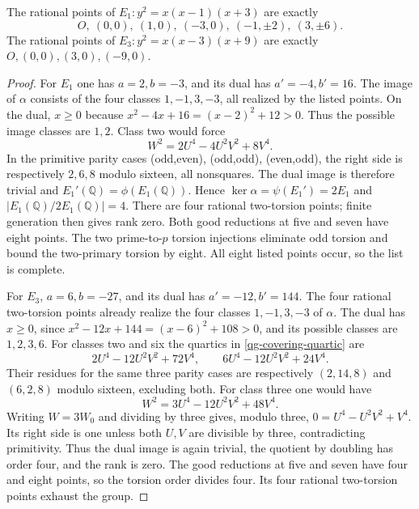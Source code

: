 \begin{lemma}\label{qg-small-twists}
The rational points of $E_1:y^2=x(x-1)(x+3)$ are exactly
\[
 O,\ (0,0),\ (1,0),\ (-3,0),\ (-1,\pm2),\ (3,\pm6).
\]
The rational points of $E_3:y^2=x(x-3)(x+9)$ are exactly
$O,(0,0),(3,0),(-9,0)$.
\end{lemma}
\begin{proof}
For $E_1$ one has $a=2,b=-3$, and its dual has $a'=-4,b'=16$.
The image of $\alpha$ consists of the four classes $1,-1,3,-3$, all
realized by the listed points. On the dual, $x\ge0$ because
$x^2-4x+16=(x-2)^2+12>0$. Thus the possible image classes are $1,2$.
Class two would force
\[
 W^2=2U^4-4U^2V^2+8V^4.
\]
In the primitive parity cases (odd,even), (odd,odd), (even,odd), the right
side is respectively $2,6,8$ modulo sixteen, all nonsquares. The dual
image is therefore trivial and $E_1'(\mathbb Q)=\phi(E_1(\mathbb Q))$.
Hence $\ker\alpha=\psi(E_1')=2E_1$ and
$|E_1(\mathbb Q)/2E_1(\mathbb Q)|=4$. There are four rational
two-torsion points; finite generation then gives rank zero.
Both good reductions at five and seven have eight points. The two
prime-to-$p$ torsion injections eliminate odd torsion and bound the
two-primary torsion by eight. All eight listed points occur, so the list
is complete.

For $E_3$, $a=6,b=-27$, and its dual has $a'=-12,b'=144$.
The four rational two-torsion points already realize the four classes
$1,-1,3,-3$ of $\alpha$. The dual has $x\ge0$, since
$x^2-12x+144=(x-6)^2+108>0$, and its possible classes are $1,2,3,6$.
For classes two and six the quartics in \eqref{qg-covering-quartic} are
\[
 2U^4-12U^2V^2+72V^4,\qquad
 6U^4-12U^2V^2+24V^4.
\]
Their residues for the same three parity cases are respectively
$(2,14,8)$ and $(6,2,8)$ modulo sixteen, excluding both.
For class three one would have
\[
 W^2=3U^4-12U^2V^2+48V^4.
\]
Writing $W=3W_0$ and dividing by three gives, modulo three,
$0=U^4-U^2V^2+V^4$. Its right side is one unless both $U,V$ are
divisible by three, contradicting primitivity. Thus the dual image is
again trivial, the quotient by doubling has order four, and the rank is
zero. The good reductions at five and seven have four and eight points,
so the torsion order divides four. Its four rational two-torsion points
exhaust the group.
\end{proof}

